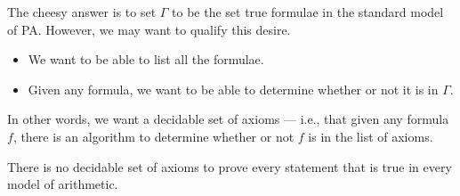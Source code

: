 \documentclass[10pt]{mypackage}
\begin{document}
The cheesy answer is to set $\Gamma$ to be the set true formulae in the standard model of PA. However, we may want to qualify this desire.
\begin{itemize}
  \item We want to be able to list all the formulae.
  \item Given any formula, we want to be able to determine whether or not it is in $\Gamma$.
\end{itemize}
In other words, we want a decidable set of axioms --- i.e., that given any formula $f$, there is an algorithm to determine whether or not $f$ is in the list of axioms.
\begin{theorem}
  There is no decidable set of axioms to prove every statement that is true in every model of arithmetic.
\end{theorem}
\end{document}
